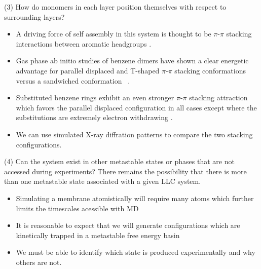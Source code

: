 \documentclass{article}
\begin{document}
   (3) How do monomers in each layer position themselves with respect to surrounding 
   layers?
   \begin{itemize}
      \item A driving force of self assembly in this system is thought to be $\pi$-$\pi$
      stacking interactions between aromatic headgroups \cite{gazit_possible_2002}. 
      \item Gas phase ab initio studies of benzene dimers have shown a clear energetic
      advantage for parallel displaced and T-shaped $\pi$-$\pi$ stacking conformations versus a
      sandwiched conformation ~\cite{sinnokrot_estimates_2002}.
      \item Substituted benzene rings exhibit an even stronger $\pi$-$\pi$ stacking 
      attraction which favors the parallel displaced configuration in all cases
      except where the substitutions are extremely electron withdrawing
      \cite{waller_hybrid_2006,ringer_effect_2006}.
      \item We can use simulated X-ray diffration patterns to compare the two 
      stacking configurations. 
   \end{itemize}
    
 
  (4) Can the system exist in other metastable states or phases that are not
  accessed during experiments?
  There remains the possibility that there is more than one metastable state 
  associated with a given LLC system.
  \begin{itemize}
    \item Simulating a membrane atomistically will require many atoms which further
    limits the timescales acessible with MD
    \item It is reasonable to expect that we will generate configurations which 
    are kinetically trapped in a metastable free energy basin
    \item We must be able to identify which state is produced experimentally and 
    why others are not.
  \end{itemize}
  
\end{document}
